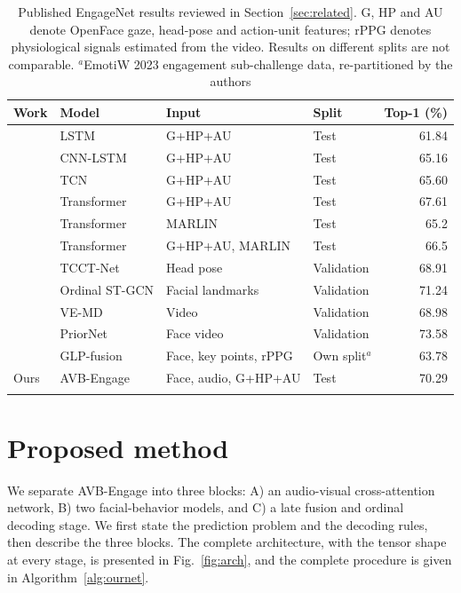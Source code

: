 \documentclass[pdflatex,iicol,sn-basic]{sn-jnl}
\newcommand{\ournet}{AVB-Engage}
\begin{document}
\begin{table}[t]
\caption{Published EngageNet results reviewed in Section~\ref{sec:related}. G, HP and AU denote OpenFace gaze, head-pose and action-unit features; rPPG denotes physiological signals estimated from the video. Results on different splits are not comparable. $^{a}$EmotiW 2023 engagement sub-challenge data, re-partitioned by the authors}\label{tab:related}
\begin{tabular*}{\textwidth}{@{\extracolsep\fill}llllr}
\toprule
Work & Model & Input & Split & Top-1 (\%)\\
\midrule
\citet{singh2023engagenet} & LSTM & G+HP+AU & Test & 61.84\\
 & CNN-LSTM & G+HP+AU & Test & 65.16\\
 & TCN & G+HP+AU & Test & 65.60\\
 & Transformer & G+HP+AU & Test & 67.61\\
 & Transformer & MARLIN & Test & 65.2\\
 & Transformer & G+HP+AU, MARLIN & Test & 66.5\\
\citet{vedernikov2024tcct} & TCCT-Net & Head pose & Validation & 68.91\\
\citet{abedi2024stgcn} & Ordinal ST-GCN & Facial landmarks & Validation & 71.24\\
\citet{augusma2026vemd} & VE-MD & Video & Validation & 68.98\\
\citet{vedernikov2026priornet} & PriorNet & Face video & Validation & 73.58\\
\citet{qin2026glpfusion} & GLP-fusion & Face, key points, rPPG & Own split$^{a}$ & 63.78\\
\midrule
Ours & \ournet & Face, audio, G+HP+AU & Test & 70.29\\
\botrule
\end{tabular*}
\end{table}

\section{Proposed method}\label{sec:method}

We separate \ournet{} into three blocks: A) an audio-visual cross-attention network, B) two facial-behavior models, and C) a late fusion and ordinal decoding stage. We first state the prediction problem and the decoding rules, then describe the three blocks. The complete architecture, with the tensor shape at every stage, is presented in Fig.~\ref{fig:arch}, and the complete procedure is given in Algorithm~\ref{alg:ournet}.
\end{document}

